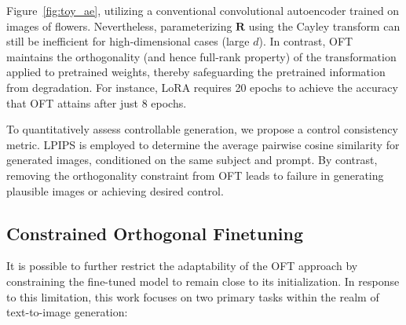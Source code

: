 Figure~\ref{fig:toy_ae}, utilizing a conventional convolutional autoencoder trained on images of flowers. Nevertheless, parameterizing $\bm{R}$ using the Cayley transform can still be inefficient for high-dimensional cases (large $d$). In contrast, OFT maintains the orthogonality (and hence full-rank property) of the transformation applied to pretrained weights, thereby safeguarding the pretrained information from degradation. For instance, LoRA requires 20 epochs to achieve the accuracy that OFT attains after just 8 epochs.  \item To quantitatively assess controllable generation, we propose a control consistency metric. LPIPS is employed to determine the average pairwise cosine similarity for generated images, conditioned on the same subject and prompt. By contrast, removing the orthogonality constraint from OFT leads to failure in generating plausible images or achieving desired control. \subsection{Constrained Orthogonal Finetuning}

It is possible to further restrict the adaptability of the OFT approach by constraining the fine-tuned model to remain close to its initialization. In response to this limitation, this work focuses on two primary tasks within the realm of text-to-image generation:

